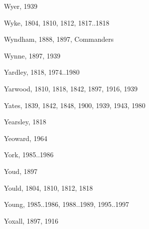 \begin{theindex}
\item Wyer, 1939
\item Wyke, 1804, 1810, 1812, 1817..1818
\item Wyndham, 1888, 1897, Commanders
\item Wynne, 1897, 1939
\item Yardley, 1818, 1974..1980
\item Yarwood, 1810, 1818, 1842, 1897, 1916, 1939
\item Yates, 1839, 1842, 1848, 1900, 1939, 1943, 1980
\item Yearsley, 1818
\item Yeoward, 1964
\item York, 1985..1986
\item Youd, 1897
\item Yould, 1804, 1810, 1812, 1818
\item Young, 1985..1986, 1988..1989, 1995..1997
\item Yoxall, 1897, 1916
\end{theindex}
